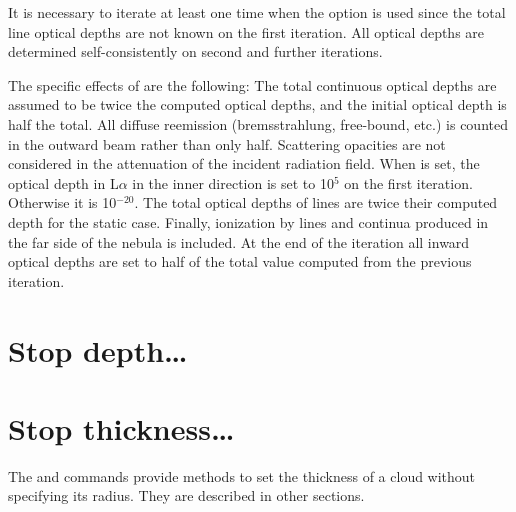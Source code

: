 It is necessary to iterate at least one time when
the  option is
used since the total line optical depths are not known on the first
iteration.
All optical depths are determined self-consistently on second
and further iterations.

The specific effects of  are the following:
The total continuous
optical depths are assumed to be twice the computed optical depths, and
the initial optical depth is half the total.
All diffuse reemission
(bremsstrahlung, free-bound, etc.) is counted in the outward beam
rather than only half.
Scattering opacities are not considered in the attenuation
of the incident radiation field.
When  is set, the optical depth
in L$\alpha$ in the inner direction is set to 10$^5$ on the first iteration.
Otherwise it is 10$^{-20}$.
The total optical depths of lines are twice their computed
depth for the static case.
Finally, ionization by lines and continua
produced in the far side of the nebula is included.
At the end of the
iteration all inward optical depths are set to half of the total value
computed from the previous iteration.

\section{Stop depth\dots}

\section{Stop thickness\dots}

The  and  commands
provide methods to set the thickness of a cloud without
specifying its radius.
They are described in other sections.






